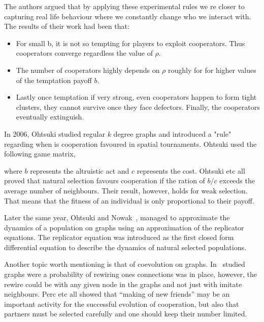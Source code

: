 \documentclass{article}
\theoremstyle{definition}
\begin{document}
The authors argued that by applying these experimental rules we re closer to
capturing real life behaviour where we constantly change who we interact with.
The results of their work had been that:

\begin{itemize}
    \item For small b, it is not so tempting for players to exploit cooperators.
    Thus cooperators converge regardless the value of \(\rho\).
    \item The number of cooperators highly depends on \(\rho\) roughly for for higher
    values of the temptation payoff \(b\).
    \item Lastly once temptation if very strong, even cooperators happen to form
    tight clusters, they cannot survive once they face defectors. Finally, the 
    cooperators eventually extinguish.
\end{itemize}

In 2006, Ohtsuki studied regular \(k\) degree graphs and introduced a "rule"
regarding when is cooperation favoured in spatial tournaments.
Ohtsuki used the following game matrix,


where \(b\) represents the altruistic act and \(c\) represents the cost.
Ohtsuki etc all proved that natural selection favours cooperation if
the ration of  \(b/c\) exceeds the average number of neighbours.
Their result, however, holds for weak selection. That means that the fitness of
an individual is only proportional to their payoff.

Later the same year, Ohtsuki and Nowak~\cite{Ohtsuki2006replicator},
managed to approximate the dynamics of a population on graphs using an approximation of the
replicator equations. The replicator equation was introduced as the first closed
form differential equation to describe the dynamics of natural selected populations.


Another topic worth mentioning is that of coevolution on graphs. In~\cite{Perc2011}
studied graphs were a probability of rewiring ones connections was in place,
however, the rewire could be with any given node in the graphs and not just
with imitate neighbours. Perc etc all showed that ``making of new friends'' may
be an important activity for the successful evolution of cooperation,
but also that partners must be selected carefully and one should keep their number
limited.
\end{document}
